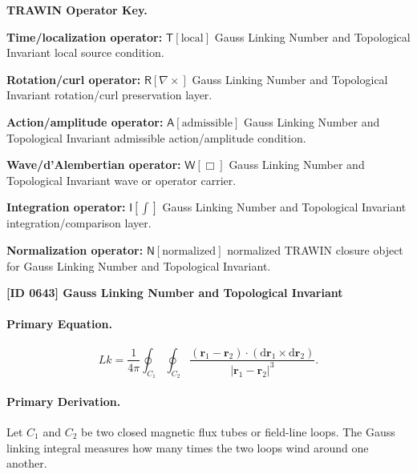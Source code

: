 \par\vspace{0.45\baselineskip}
\noindent\begin{minipage}[t]{\linewidth}
\begingroup
\small
\raggedright
\textbf{TRAWIN Operator Key.}\par
\noindent\textbf{Time/localization operator:} $\mathsf{T}\!\left[\mathrm{local}\right]$ Gauss Linking Number and Topological Invariant local source condition.\par
\noindent\textbf{Rotation/curl operator:} $\mathsf{R}\!\left[\nabla\times\right]$ Gauss Linking Number and Topological Invariant rotation/curl preservation layer.\par
\noindent\textbf{Action/amplitude operator:} $\mathsf{A}\!\left[\mathrm{admissible}\right]$ Gauss Linking Number and Topological Invariant admissible action/amplitude condition.\par
\noindent\textbf{Wave/d'Alembertian operator:} $\mathsf{W}\!\left[\Box\right]$ Gauss Linking Number and Topological Invariant wave or operator carrier.\par
\noindent\textbf{Integration operator:} $\mathsf{I}\!\left[\int\right]$ Gauss Linking Number and Topological Invariant integration/comparison layer.\par
\noindent\textbf{Normalization operator:} $\mathsf{N}\!\left[\mathrm{normalized}\right]$ normalized TRAWIN closure object for Gauss Linking Number and Topological Invariant.\par
\endgroup
\end{minipage}

\clearpage
\noindent\textbf{[ID 0643] Gauss Linking Number and Topological Invariant}\par
\vspace{0.35em}
\begingroup\small
\paragraph{Primary Equation.}
\begin{equation}
Lk
=
\frac{1}{4\pi}
\oint_{C_1}
\oint_{C_2}
\frac{
(\mathbf{r}_1-\mathbf{r}_2)
\cdot
(\mathrm{d}\mathbf{r}_1\times \mathrm{d}\mathbf{r}_2)
}{
|\mathbf{r}_1-\mathbf{r}_2|^3
}.
\end{equation}

\paragraph{Primary Derivation.}
Let $C_1$ and $C_2$ be two closed magnetic flux tubes or field-line loops.  
The Gauss linking integral measures how many times the two loops wind around one another.


